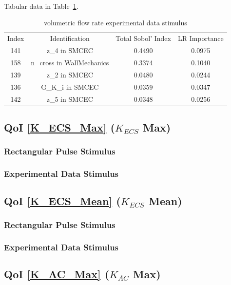\documentclass[12pt]{article}
\numberwithin{equation}{section}
\begin{document}
Tabular data in Table~\ref{qoi_vol_flow_ex}.

\begin{table}[h]
\centering
\begin{tabular}{cccc}
Index & Identification & Total Sobol' Index & LR Importance \\
141 &  z\_4 in SMCEC & 0.4490 & 0.0975\\
158 & n\_cross in WallMechanics & 0.3374 & 0.1040\\
 139 & z\_2 in SMCEC & 0.0480 & 0.0244\\
   136 & G\_K\_i in SMCEC & 0.0359 & 0.0347\\
 142 & z\_5 in SMCEC & 0.0348 & 0.0256\\
\end{tabular}
\caption{volumetric flow rate experimental data stimulus}
\label{qoi_vol_flow_ex}
\end{table}

\newpage

\subsection{QoI \eqref{K_ECS_Max} ($K_{ECS}$ Max)}

\subsubsection{Rectangular Pulse Stimulus}

\subsubsection{Experimental Data Stimulus}

\subsection{QoI \eqref{K_ECS_Mean} ($K_{ECS}$ Mean)}

\subsubsection{Rectangular Pulse Stimulus}

\subsubsection{Experimental Data Stimulus}

\subsection{QoI \eqref{K_AC_Max} ($K_{AC}$ Max)}
\end{document}
